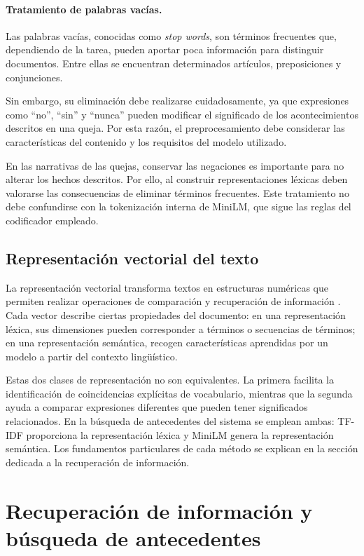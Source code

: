 \paragraph{Tratamiento de palabras vacías.}

Las palabras vacías, conocidas como \textit{stop words}, son términos frecuentes que, dependiendo de la tarea, pueden aportar poca información para distinguir documentos. Entre ellas se encuentran determinados artículos, preposiciones y conjunciones.

Sin embargo, su eliminación debe realizarse cuidadosamente, ya que expresiones como ``no'', ``sin'' y ``nunca'' pueden modificar el significado de los acontecimientos descritos en una queja. Por esta razón, el preprocesamiento debe considerar las características del contenido y los requisitos del modelo utilizado.

En las narrativas de las quejas, conservar las negaciones es importante para no alterar los hechos descritos. Por ello, al construir representaciones léxicas deben valorarse las consecuencias de eliminar términos frecuentes. Este tratamiento no debe confundirse con la tokenización interna de MiniLM, que sigue las reglas del codificador empleado.

\subsection{Representación vectorial del texto}

La representación vectorial transforma textos en estructuras numéricas que permiten realizar operaciones de comparación y recuperación de información \cite{manning2008ir}. Cada vector describe ciertas propiedades del documento: en una representación léxica, sus dimensiones pueden corresponder a términos o secuencias de términos; en una representación semántica, recogen características aprendidas por un modelo a partir del contexto lingüístico.

Estas dos clases de representación no son equivalentes. La primera facilita la identificación de coincidencias explícitas de vocabulario, mientras que la segunda ayuda a comparar expresiones diferentes que pueden tener significados relacionados. En la búsqueda de antecedentes del sistema se emplean ambas: TF-IDF proporciona la representación léxica y MiniLM genera la representación semántica. Los fundamentos particulares de cada método se explican en la sección dedicada a la recuperación de información.

\section{Recuperación de información y búsqueda de antecedentes}
\label{sec:busqueda_antecedentes}

